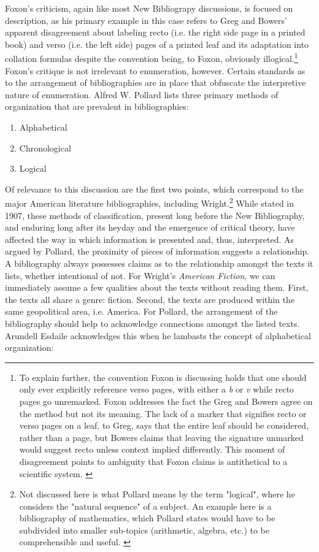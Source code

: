 Foxon's criticism, again like most New Bibliograpy discussions, is focused on description, as his primary example in this case refers to Greg and Bowers' apparent disagreement about labeling recto (i.e. the right side page in a printed book) and verso (i.e. the left side) pages of a printed leaf and its adaptation into collation formulas despite the convention being, to Foxon, obviously illogical.\footnote{To explain further, the convention Foxon is discussing holds that one should only ever explicitly reference verso pages, with either a \textit{b} or \textit{v} while recto pages go unremarked. Foxon addresses the fact the Greg and Bowers agree on the method but not its meaning. The lack of a marker that signifies recto or verso pages on a leaf, to Greg, says that the entire leaf should be considered, rather than a page, but Bowers claims that leaving the signature unmarked would suggest recto unless context implied differently. This moment of disagreement points to ambiguity that Foxon claims is antithetical to a scientific system. \autocite[8-9]{david_f._foxon_thoughts_1970}} Foxon's critique is not irrelevant to enumeration, however. Certain standards as to the arrangement of bibliographies are in place that obfuscate the interpretive nature of enumeration. Alfred W. Pollard lists three primary methods of organization that are prevalent in bibliographies:\autocite[133]{pollard_arrangment_1976}
	\begin{enumerate}[label=(\roman*), leftmargin=1in]
	\item Alphabetical
	\item Chronological
	\item Logical
	\end{enumerate}
Of relevance to this discussion are the first two points, which correspond to the major American literature bibliographies, including Wright.\footnote{Not discussed here is what Pollard means by the term "logical", where he considers the "natural sequence" of a subject. An  example here is a bibliography of mathematics, which Pollard states would have to be subdivided into smaller sub-topics (arithmetic, algebra, etc.) to be comprehensible and useful. \autocite[137]{pollard_arrangment_1976}} While stated in 1907, these methods of classification, present long before the New Bibliography, and enduring long after its heyday and the emergence of critical theory, have affected the way in which information is presented and, thus, interpreted. As argued by Pollard, the proximity of pieces of information suggests a relationship. A bibliography always possesses claims as to the relationship amongst the texts it lists, whether intentional of not. For Wright's \textit{American Fiction}, we can immediately assume a few qualities about the texts without reading them. First, the texts all share a genre: fiction. Second, the texts are produced within the same geopolitical area, i.e. America. For Pollard, the arrangement of the bibliography should help to acknowledge connections amongst the listed texts. Arundell Esdaile acknowledges this when he lambasts the concept of alphabetical organization: 

